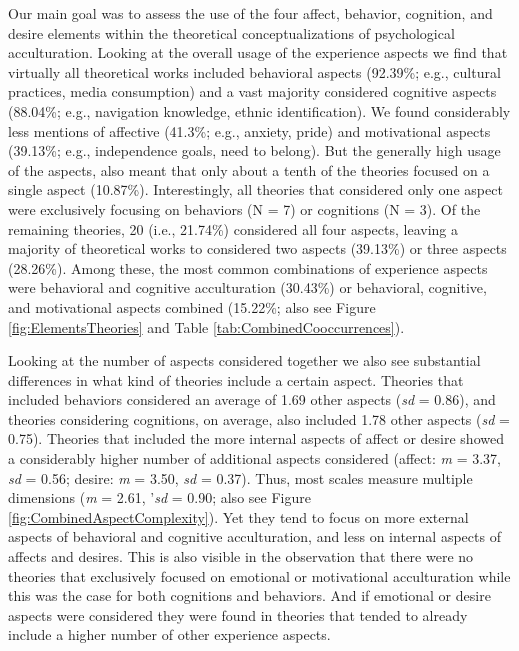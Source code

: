 Our main goal was to assess the use of the four affect, behavior,
cognition, and desire elements within the theoretical conceptualizations
of psychological acculturation. Looking at the overall usage of the
experience aspects we find that virtually all theoretical works included
behavioral aspects (92.39\%; e.g., cultural practices, media
consumption) and a vast majority considered cognitive aspects (88.04\%;
e.g., navigation knowledge, ethnic identification). We found
considerably less mentions of affective (41.3\%; e.g., anxiety, pride)
and motivational aspects (39.13\%; e.g., independence goals, need to
belong). But the generally high usage of the aspects, also meant that
only about a tenth of the theories focused on a single aspect (10.87\%).
Interestingly, all theories that considered only one aspect were
exclusively focusing on behaviors (N = 7) or cognitions (N = 3). Of the
remaining theories, 20 (i.e., 21.74\%) considered all four aspects,
leaving a majority of theoretical works to considered two aspects
(39.13\%) or three aspects (28.26\%). Among these, the most common
combinations of experience aspects were behavioral and cognitive
acculturation (30.43\%) or behavioral, cognitive, and motivational
aspects combined (15.22\%; also see Figure \ref{fig:ElementsTheories}
and Table \ref{tab:CombinedCooccurrences}).

Looking at the number of aspects considered together we also see
substantial differences in what kind of theories include a certain
aspect. Theories that included behaviors considered an average of 1.69
other aspects (\textit{sd} = 0.86), and theories considering cognitions,
on average, also included 1.78 other aspects (\textit{sd} = 0.75).
Theories that included the more internal aspects of affect or desire
showed a considerably higher number of additional aspects considered
(affect: \textit{m} = 3.37, \textit{sd} = 0.56; desire: \textit{m} =
3.50, \textit{sd} = 0.37). Thus, most scales measure multiple dimensions
(\textit{m} = 2.61, '\textit{sd} = 0.90; also see Figure
\ref{fig:CombinedAspectComplexity}). Yet they tend to focus on more
external aspects of behavioral and cognitive acculturation, and less on
internal aspects of affects and desires. This is also visible in the
observation that there were no theories that exclusively focused on
emotional or motivational acculturation while this was the case for both
cognitions and behaviors. And if emotional or desire aspects were
considered they were found in theories that tended to already include a
higher number of other experience aspects.

